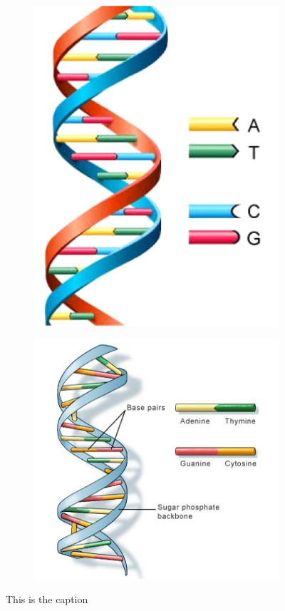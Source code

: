 \documentclass{llncs}
\begin{document}
\begin{figure}
	\begin{subfigure}{.5\textwidth}
		\includegraphics[width=.6\linewidth]{./figs/DNA-2}
		\label{fig:subfig1}
	\end{subfigure}
	\begin{subfigure}{.5\textwidth}
		\includegraphics[width=.9\linewidth]{./figs/DNA-3}
		\label{fig:subfig2}
	\end{subfigure}
	\caption[caption]{This is the caption}
\end{figure}
\end{document}
